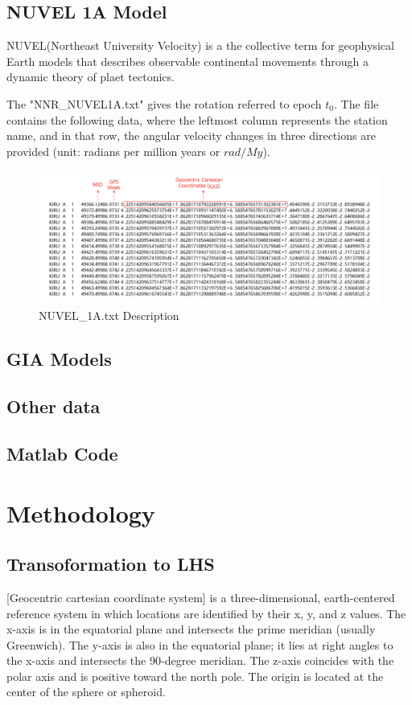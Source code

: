 \documentclass{article}
\begin{document}
\subsection{NUVEL 1A Model}
NUVEL(Northeast University Velocity) is a the collective term for geophysical Earth models that describes observable
continental movements through a dynamic theory of plaet tectonics.

The "NNR\_NUVEL1A.txt" gives the rotation referred to epoch $t_0$. 
The file contains the following data, where the leftmost column represents the station name, 
and in that row, the angular velocity changes in three directions are provided (unit: radians per million years or $rad/My$).
\begin{figure}[htbp]
    \centering
    \includegraphics[width=12cm]{./source/xyz.png}
    \caption{NUVEL\_1A.txt Description}
    \label{fig:Nuvel-1A}
\end{figure}
\subsection{GIA Models}

\subsection{Other data}

\subsection{Matlab Code}

\section{Methodology}
\subsection{Transoformation to LHS}
[Geocentric cartesian coordinate system] is a three-dimensional, earth-centered reference system in which locations are identified by their x, y, and z values. 
The x-axis is in the equatorial plane and intersects the prime meridian (usually Greenwich). 
The y-axis is also in the equatorial plane; it lies at right angles to the x-axis and intersects the 90-degree meridian. 
The z-axis coincides with the polar axis and is positive toward the north pole. The origin is located at the center of the sphere or spheroid.
\end{document}
